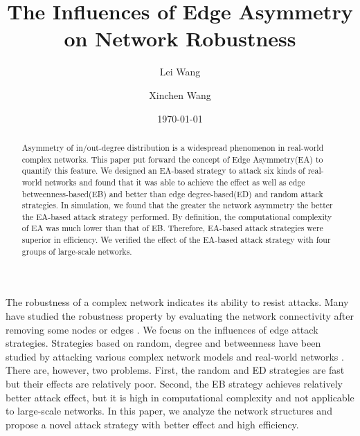 \documentclass[aps,prl,twocolumn,showpacs,superscriptaddress,groupedaddress]{revtex4}  %
\begin{document}
\widetext
{}


\title{The Influences of Edge Asymmetry on Network Robustness}
\author{Lei Wang}
\author{Xinchen Wang}
\date{\today}


\begin{abstract}
Asymmetry of in/out-degree distribution is a widespread phenomenon in real-world complex networks. This paper put forward the concept of Edge Asymmetry(EA) to quantify this feature. We designed an EA-based strategy to attack six kinds of real-world networks and found that it was able to achieve the effect as well as edge betweenness-based(EB) and better than edge degree-based(ED) and random attack strategies. In simulation, we found that the greater the network asymmetry the better the EA-based attack strategy performed. By definition, the computational complexity of EA was much lower than that of EB. Therefore, EA-based attack strategies were superior in efficiency. We verified the effect of the EA-based attack strategy with four groups of large-scale networks.
\end{abstract}

\maketitle


The robustness of a complex network indicates its ability to resist attacks. Many have studied the robustness property by evaluating the network connectivity after removing some nodes or edges \cite{Albert2000Error}\cite{crucitti2004error}\cite{Shargel2003Optimization}. We focus on the influences of edge attack strategies. Strategies based on random, degree and betweenness have been studied by attacking various complex network models and real-world networks \cite{Holme2002Attack}\cite{kurant2007error}\cite{iyer2013attack}.  There are, however, two problems. First, the random and ED strategies are fast but their effects are relatively poor. Second, the EB strategy achieves relatively better attack effect, but it is high in computational complexity and not applicable to large-scale networks. In this paper, we analyze the network structures and propose a novel attack strategy with better effect and high efficiency.
\end{document}
